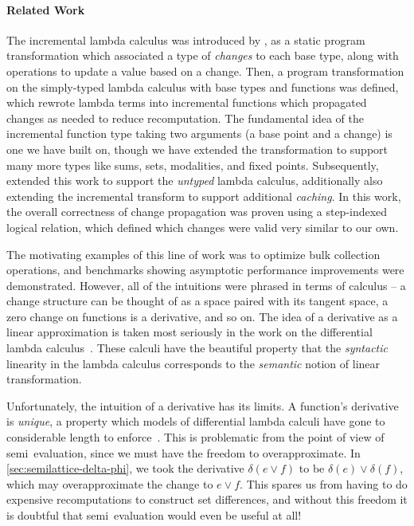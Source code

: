 \paragraph{Related Work}
The incremental lambda calculus was introduced by \citet{incremental},
as a static program transformation which associated a type of
\emph{changes} to each base type, along with operations to update a
value based on a change.  Then, a program transformation on the
simply-typed lambda calculus with base types and functions was
defined, which rewrote lambda terms into incremental functions which
propagated changes as needed to reduce recomputation. The fundamental
idea of the incremental function type taking two arguments (a base
point and a change) is one we have built on, though we have extended
the transformation to support many more types like sums, sets,
modalities, and fixed points.
%
Subsequently, \citet{DBLP:conf/esop/GiarrussoRS19} extended this work
to support the \emph{untyped} lambda calculus, additionally also
extending the incremental transform to support additional
\emph{caching}. In this work, the overall correctness of change
propagation was proven using a step-indexed logical relation, which
defined which changes were valid very similar to our own.

The motivating examples of this line of work was to optimize bulk
collection operations, and benchmarks showing asymptotic performance
improvements were demonstrated. However, all of the intuitions were
phrased in terms of calculus -- a change structure can be thought of
as a space paired with its tangent space, a zero change on functions
is a derivative, and so on. The idea of a derivative as a linear
approximation is taken most seriously in the work on
the differential lambda calculus~\cite{dlc}. These calculi have the
beautiful property that the \emph{syntactic} linearity in
the lambda calculus corresponds to the \emph{semantic} notion of
linear transformation. 

Unfortunately, the intuition of a derivative has its limits. A
function's derivative is \emph{unique}, a property which models of
differential lambda calculi have gone to considerable length to
enforce~\cite{differential-categories}. This is problematic from the
point of view of semi\naive\ evaluation, since we must have the
freedom to overapproximate. In
\cref{sec:semilattice-delta-phi}, we took the derivative
$\delta(e \vee f)$ to be $\delta(e) \vee \delta(f)$, which may
overapproximate the change to $e \vee f$. This spares us from having
to do expensive recomputations to construct set differences, and
without this freedom it is doubtful that semi\naive\ evaluation would
even be useful at all!

